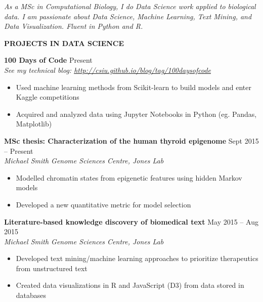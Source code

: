 \documentclass{res}
\renewcommand{\section}[1]{%
  \vspace{0.3in}%
  \centerline{\uppercase{\bf{#1}}}%
  \vspace{-6pt}}
\newcommand{\linehead}[2]{%
  {\bf #1} \hfill #2\\}
\newcommand{\linetitle}[1]{%
  {\sl #1}}
\begin{document}
\begin{resume}


\vspace{-1em}
\begin{center}
  {\it As a MSc in Computational Biology, I do Data Science work applied to biological data. I am passionate about Data Science, Machine Learning, Text Mining, and Data Visualization. Fluent in Python and R.}
\end{center}
\vspace{-1.5em}

\section{Projects in Data science}

\linehead{100 Days of Code}{Present}
\linetitle{See my technical blog: \url{http://csiu.github.io/blog/tag/100daysofcode}}
\begin{itemize}
  \item Used machine learning methods from Scikit-learn to build models and enter Kaggle competitions
  \item Acquired and analyzed data using Jupyter Notebooks in Python (eg. Pandas, Matplotlib)
\end{itemize}

\linehead{MSc thesis: Characterization of the human thyroid epigenome}{Sept 2015 -- Present}
\linetitle{Michael Smith Genome Sciences Centre, Jones Lab}
\begin{itemize}
  \item Modelled chromatin states from epigenetic features using hidden Markov models
  \item Developed a new quantitative metric for model selection
\end{itemize}

\linehead{Literature-based knowledge discovery of biomedical text}{May 2015 -- Aug 2015}
\linetitle{Michael Smith Genome Sciences Centre, Jones Lab}
\begin{itemize}
  \item Developed text mining/machine learning approaches to prioritize therapeutics from unstructured text
  \item Created data visualizations in R and JavaScript (D3) from data stored in databases
\end{itemize}


\end{resume}
\end{document}
